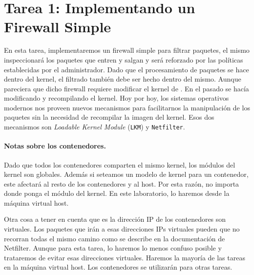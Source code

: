 %


\section{Tarea 1: Implementando un Firewall Simple} 

En esta tarea, implementaremos un firewall simple para filtrar paquetes, el mismo inspeccionará los paquetes que entren y salgan y será reforzado por las políticas establecidas por el administrador. Dado que el procesamiento de paquetes se hace dentro del kernel, el filtrado también debe ser hecho dentro del mismo. Aunque pareciera que dicho firewall requiere modificar el kernel de \linux. En el pasado se hacía modificando y recompilando el kernel. Hoy por hoy, los sistemas operativos \linux modernos nos proveen nuevos mecanismos para facilitarnos la manipulación de los paquetes sin la necesidad de recompilar la imagen del kernel. Esos dos mecanismos son \textit{Loadable Kernel Module} (\texttt{LKM}) y \texttt{Netfilter}.



\paragraph{Notas sobre los contenedores.}
Dado que todos los contenedores comparten el mismo kernel, los módulos del kernel son globales.
Además si seteamos un modelo de kernel para un contenedor, este afectará al resto de los contenedores y al host. Por esta razón, no importa donde ponga el módulo del kernel. En este laboratorio, lo haremos desde la máquina virtual host.

Otra cosa a tener en cuenta que es la dirección IP de los contenedores son virtuales.
Los paquetes que irán a esas direcciones IPs virtuales pueden que no recorran todas el mismo camino como se describe en la documentación de Netfilter.
Aunque para esta tarea, lo haremos lo menos confuso posible y trataremos de evitar esas direcciones virtuales.
Haremos la mayoría de las tareas en la máquina virtual host. Los contenedores se utilizarán para otras tareas.

